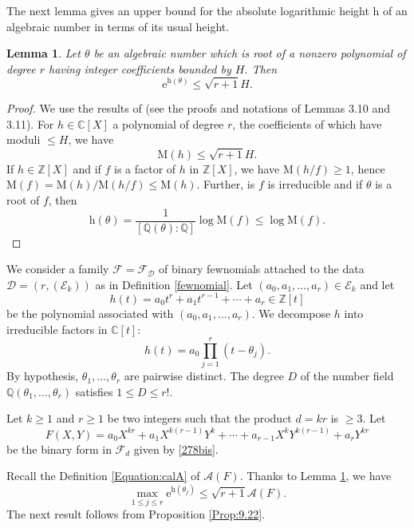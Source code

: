 \documentclass[10pt]{article}
\newtheorem{lemma}[theorem]{Lemma}
\theoremstyle{definition}
\numberwithin{equation}{section}
\newcommand {\Q}{{\mathbb{Q}}}
\newcommand {\C}{{\mathbb{C}}}
\newcommand {\Z}{{\mathbb{Z}}}
\newcommand{\rmh}{\mathrm {h}}
\newcommand{\rmM}{\mathrm {M}}
\newcommand{\rme}{\mathrm {e}}
\newcommand{\calA}{\mathcal {A}}
\newcommand{\calE}{\mathcal {E}}
\newcommand{\calF}{\mathcal {F}}
\begin{document}
\bigskip

The next lemma gives an upper bound for the absolute logarithmic height $\rmh$ of an algebraic number in terms of its usual height. 

 \begin{lemma}\label{Lemme:hVersusH}
Let $\theta$ be an algebraic number which is root of a nonzero polynomial of degree $r$ having integer coefficients bounded by $H$. Then
\begin{equation*} 
 \rme^{\rmh(\theta)}\leqslant \sqrt{r+1} H.
\end{equation*}
 \end{lemma}
 
\begin{proof} 
We use the results of \cite[Chap.~3]{W} (see the proofs and notations of Lemmas 3.10 and 3.11). For $h\in\C[X]$ a polynomial of degree $r$, the coefficients of which have moduli $\leqslant H$, we have
\[
\rmM(h)\leqslant \sqrt{r+1}H.
\]
If $h\in\Z[X]$ and if $f$ is a factor of $h$ in $\Z[X]$, we have 
$\rmM(h/f)\geqslant 1$, hence $\rmM(f)=\rmM(h)/\rmM(h/f)\leqslant \rmM(h)$. 
Further, is $f$ is irreducible and if $\theta$ is a root of $f$, then 
\[
 \rmh(\theta)= \frac 1 {[\Q(\theta):\Q]} \log \rmM(f) \leqslant \log \rmM(f).
 \]
\end{proof}

We consider a family $\mathcal F = \mathcal F_{\boldsymbol {\mathcal D}}$ of binary fewnomials attached to the data $\boldsymbol {\mathcal D}=(r, (\mathcal E_k))$ as in Definition \ref{fewnomial}. Let $(a_0,a_1,\dots,a_r)\in\calE_k$ and let
\[
h(t)=
a_0t^r+a_1t^{r-1}+\cdots+a_r\in\Z[t]
\]
be the polynomial associated with $(a_0,a_1,\dots,a_r)$.
We decompose $h$ into irreducible factors in $\C[t]$:
\[
h(t)=a_0\prod_{j=1}^r(t-\theta_j).
\]
By hypothesis, $\theta_1,\dots,\theta_r$ are pairwise distinct. The degree $D$ of the number field $\Q(\theta_1,\dots,\theta_r)$ 
satisfies $1\leqslant D\leqslant r!$. 

Let $k\geqslant 1$ and $r\geqslant 1$ be two integers such that the product $d=kr$ is $\geqslant 3$. Let 
 \begin{equation}\label{Equation:F}
 F(X,Y)=a_0X^{kr}+a_1X^{k(r-1)}Y^k+\cdots+a_{r-1}X^kY^{k(r-1)}+a_rY^{kr}
 \end{equation}
be the binary form in $\calF_d$ given by \eqref{278bis}.

Recall the Definition \eqref{Equation:calA} of $\calA(F)$. Thanks to Lemma \ref{Lemme:hVersusH}, we have
\[
\max_{1\leqslant j\leqslant r} \rme^{ \rmh(\theta_j)}\leqslant \sqrt{r+1} {\calA}(F).
\] 
The next result follows from Proposition \ref{Prop:9.22}. 
\end{document}
